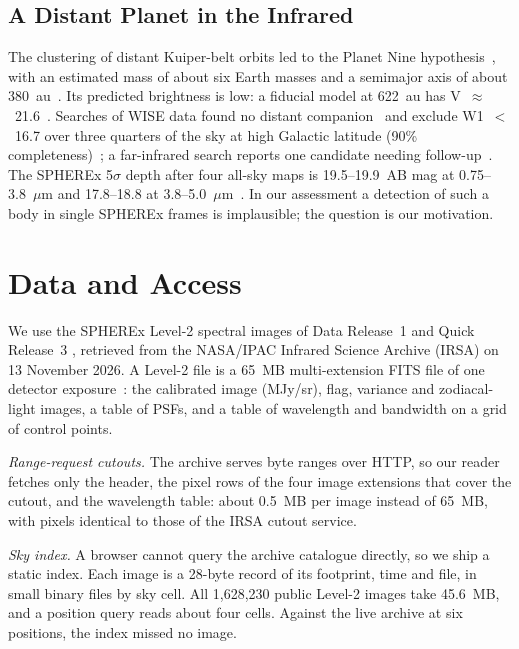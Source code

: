 \documentclass[conference]{IEEEtran}
\begin{document}
\subsection{A Distant Planet in the Infrared}

The clustering of distant Kuiper-belt orbits led to the Planet Nine hypothesis~\cite{batygin2016}, with an estimated mass of about six Earth masses and a semimajor axis of about 380~au~\cite{brown2021}. Its predicted brightness is low: a fiducial model at 622~au has V~$\approx$~21.6~\cite{fortney2016}. Searches of WISE data found no distant companion~\cite{luhman2014search} and exclude W1~$<$~16.7 over three quarters of the sky at high Galactic latitude (90\% completeness)~\cite{meisner2018p9}; a far-infrared search reports one candidate needing follow-up~\cite{phan2025}. The SPHEREx 5$\sigma$ depth after four all-sky maps is 19.5--19.9~AB mag at 0.75--3.8~$\mu$m and 17.8--18.8 at 3.8--5.0~$\mu$m~\cite{bock2026}. In our assessment a detection of such a body in single SPHEREx frames is implausible; the question is our motivation.

\section{Data and Access}

We use the SPHEREx Level-2 spectral images of Data Release~1 \cite{spherexdr1} and Quick Release~3 \cite{spherexqr3}, retrieved from the NASA/IPAC Infrared Science Archive (IRSA) on 13 November 2026. A Level-2 file is a 65~MB multi-extension FITS file of one detector exposure~\cite{akeson2026,expsupp2026}: the calibrated image (MJy/sr), flag, variance and zodiacal-light images, a table of PSFs, and a table of wavelength and bandwidth on a grid of control points.

\emph{Range-request cutouts.} The archive serves byte ranges over HTTP, so our reader fetches only the header, the pixel rows of the four image extensions that cover the cutout, and the wavelength table: about 0.5~MB per image instead of 65~MB, with pixels identical to those of the IRSA cutout service.

\emph{Sky index.} A browser cannot query the archive catalogue directly, so we ship a static index. Each image is a 28-byte record of its footprint, time and file, in small binary files by sky cell. All 1,628,230 public Level-2 images take 45.6~MB, and a position query reads about four cells. Against the live archive at six positions, the index missed no image.
\end{document}
